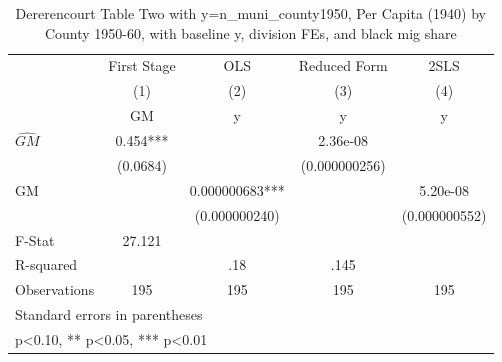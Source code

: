\begin{table}[htbp]\centering
\def\sym#1{\ifmmode^{#1}\else\(^{#1}\)\fi}
\caption{Dererencourt Table Two with y=n\_muni\_county1950, Per Capita (1940) by County 1950-60, with baseline y, division FEs, and black mig share}
\begin{tabular}{l*{4}{c}}
\toprule
                    & First Stage   &         OLS   &Reduced Form   &        2SLS   \\
                    &\multicolumn{1}{c}{(1)}&\multicolumn{1}{c}{(2)}&\multicolumn{1}{c}{(3)}&\multicolumn{1}{c}{(4)}\\
                    &\multicolumn{1}{c}{GM}&\multicolumn{1}{c}{y}&\multicolumn{1}{c}{y}&\multicolumn{1}{c}{y}\\
\midrule
$\hat{GM}$          &       0.454***&               &    2.36e-08   &               \\
                    &    (0.0684)   &               &(0.000000256)   &               \\
\addlinespace
GM                  &               & 0.000000683***&               &    5.20e-08   \\
                    &               &(0.000000240)   &               &(0.000000552)   \\
\midrule
F-Stat              &      27.121   &               &               &               \\
R-squared           &               &         .18   &        .145   &               \\
Observations        &         195   &         195   &         195   &         195   \\
\bottomrule
\multicolumn{5}{l}{\footnotesize Standard errors in parentheses}\\
\multicolumn{5}{l}{\footnotesize * p<0.10, ** p<0.05, *** p<0.01}\\
\end{tabular}
\end{table}
